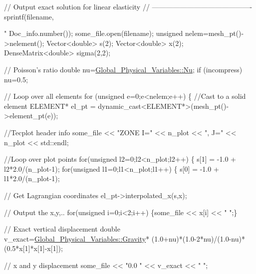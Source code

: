 \begin{DoxyCodeInclude}


 \textcolor{comment}{// Output exact solution for linear elasticity}
 \textcolor{comment}{// -------------------------------------------}
 sprintf(filename,\textcolor{stringliteral}{"%
         Doc\_info.number());
 some\_file.open(filename);
 \textcolor{keywordtype}{unsigned} nelem=mesh\_pt()->nelement(); 
 Vector<double> s(2);
 Vector<double> x(2);
 DenseMatrix<double> sigma(2,2);
 
 \textcolor{comment}{// Poisson's ratio}
 \textcolor{keywordtype}{double} nu=\hyperlink{namespaceGlobal__Physical__Variables_a3962c36313826b19f216f6bbbdd6a477}{Global\_Physical\_Variables::Nu};
 \textcolor{keywordflow}{if} (incompress) nu=0.5;

 \textcolor{comment}{// Loop over all elements}
 \textcolor{keywordflow}{for} (\textcolor{keywordtype}{unsigned} e=0;e<nelem;e++)
  \{  
   \textcolor{comment}{//Cast to a solid element}
   ELEMENT* el\_pt = \textcolor{keyword}{dynamic\_cast<}ELEMENT*\textcolor{keyword}{>}(mesh\_pt()->element\_pt(e));
    
   \textcolor{comment}{//Tecplot header info }
   some\_file << \textcolor{stringliteral}{"ZONE I="} << n\_plot << \textcolor{stringliteral}{", J="} << n\_plot << std::endl;
   
   \textcolor{comment}{//Loop over plot points}
   \textcolor{keywordflow}{for}(\textcolor{keywordtype}{unsigned} l2=0;l2<n\_plot;l2++)
    \{
     s[1] = -1.0 + l2*2.0/(n\_plot-1);
     \textcolor{keywordflow}{for}(\textcolor{keywordtype}{unsigned} l1=0;l1<n\_plot;l1++)
      \{
       s[0] = -1.0 + l1*2.0/(n\_plot-1);
       
       \textcolor{comment}{// Get Lagrangian coordinates}
         el\_pt->interpolated\_x(s,x);

         \textcolor{comment}{// Output the x,y,..}
         \textcolor{keywordflow}{for}(\textcolor{keywordtype}{unsigned} i=0;i<2;i++) 
          \{some\_file << x[i] << \textcolor{stringliteral}{" "};\}

         \textcolor{comment}{// Exact vertical displacement}
         \textcolor{keywordtype}{double} v\_exact=\hyperlink{namespaceGlobal__Physical__Variables_a8b80d3e8d63b8d0a0ed435a2dd7fe2ad}{Global\_Physical\_Variables::Gravity}*
          (1.0+nu)*(1.0-2*nu)/(1.0-nu)*(0.5*x[1]*x[1]-x[1]);
         
         \textcolor{comment}{// x and y displacement}
         some\_file << \textcolor{stringliteral}{"0.0 "} <<   v\_exact << \textcolor{stringliteral}{" "};

}
\end{DoxyCodeInclude}
